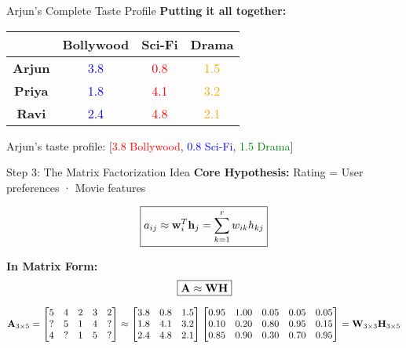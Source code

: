 \documentclass{beamer}
\begin{document}
\begin{frame}{Arjun's Complete Taste Profile}
\textbf{Putting it all together:}

\pause
\begin{center}
\renewcommand{\arraystretch}{1.6}
\begin{tabular}{c|ccc}
 & \textbf{Bollywood} & \textbf{Sci-Fi} & \textbf{Drama} \\
\hline
\textbf{Arjun} & \cellcolor{red!30}\textcolor{blue}{3.8} & \cellcolor{blue!30}\textcolor{red}{0.8} & \cellcolor{green!30}\textcolor{orange}{1.5} \\
\textbf{Priya} & \textcolor{blue}{1.8} & \textcolor{red}{4.1} & \textcolor{orange}{3.2} \\
\textbf{Ravi} & \textcolor{blue}{2.4} & \textcolor{red}{4.8} & \textcolor{orange}{2.1}
\end{tabular}
\end{center}

\pause
\begin{keypointsbox}{}
Arjun's taste profile: [\textcolor{red}{3.8 Bollywood}, \textcolor{blue}{0.8 Sci-Fi}, \textcolor{green}{1.5 Drama}]
\end{keypointsbox}
\end{frame}

\begin{frame}{Step 3: The Matrix Factorization Idea}
\textbf{Core Hypothesis:} Rating = User preferences · Movie features

\pause
\begin{equation*}
\boxed{a_{ij} \approx \mathbf{w}_i^T \mathbf{h}_j = \sum_{k=1}^r w_{ik} h_{kj}}
\end{equation*}

\pause
\textbf{In Matrix Form:}
\begin{equation*}
\boxed{\mathbf{A} \approx \mathbf{W} \mathbf{H}}
\end{equation*}

\pause
\begin{center}
$\mathbf{A}_{3 \times 5} =
\begin{bmatrix}
5 & 4 & 2 & 3 & 2 \\
? & 5 & 1 & 4 & ? \\
4 & ? & 1 & 5 & ? 
\end{bmatrix}
\approx
\begin{bmatrix}
3.8 & 0.8 & 1.5 \\
1.8 & 4.1 & 3.2 \\
2.4 & 4.8 & 2.1
\end{bmatrix}
\begin{bmatrix}
0.95 & 1.00 & 0.05 & 0.05 & 0.05 \\
0.10 & 0.20 & 0.80 & 0.95 & 0.15 \\
0.85 & 0.90 & 0.30 & 0.70 & 0.95
\end{bmatrix}
= \mathbf{W}_{3 \times 3} \mathbf{H}_{3 \times 5}$
\end{center}
\end{frame}
\end{document}
